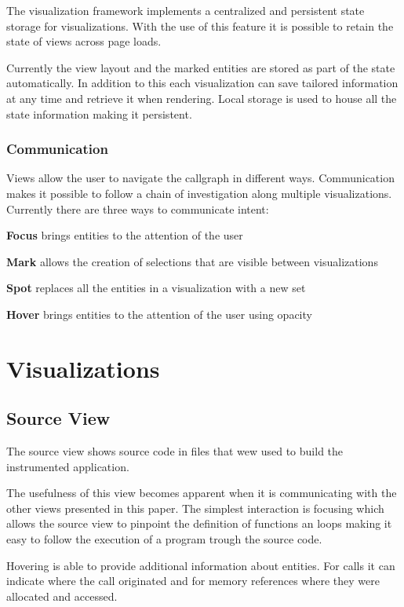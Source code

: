 \documentclass[conference]{IEEEtran}
\begin{document}
The visualization framework implements a centralized and persistent state storage for visualizations. With the use of this feature it is possible to retain the state of views across page loads.

Currently the view layout and the marked entities are stored as part of the state automatically. In addition to this each visualization can save tailored information at any time and retrieve it when rendering. Local storage is used to house all the state information making it persistent.

\subsubsection{Communication}

Views allow the user to navigate the callgraph in different ways. Communication makes it possible to follow a chain of investigation along multiple visualizations. Currently there are three ways to communicate intent:

\textbf{Focus} brings entities to the attention of the user

\textbf{Mark} allows the creation of selections that are visible between visualizations

\textbf{Spot} replaces all the entities in a visualization with a new set

\textbf{Hover} brings entities to the attention of the user using opacity

\section{Visualizations}

\subsection{Source View}

The source view shows source code in files that wew used to build the instrumented application.

The usefulness of this view becomes apparent when it is communicating with the other views presented in this paper. The simplest interaction is focusing which allows the source view to pinpoint the definition of functions an loops making it easy to follow the execution of a program trough the source code.

Hovering is able to provide additional information about entities. For calls it can indicate where the call originated and for memory references where they were allocated and accessed.
\end{document}
